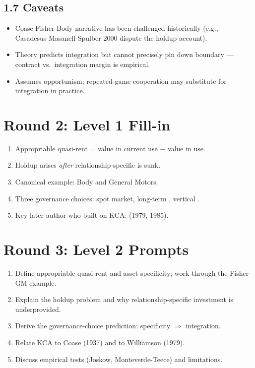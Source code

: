 \documentclass[11pt]{article}
\newcommand{\blank}[1]{\underline{\hspace{#1}}}
\begin{document}
\subsection*{1.7 Caveats}
\begin{alertbox}
\begin{itemize}
\item Coase-Fisher-Body narrative has been challenged historically (e.g., Casadesus-Masanell-Spulber 2000 dispute the holdup account).
\item Theory predicts integration but cannot precisely pin down boundary --- contract vs.\ integration margin is empirical.
\item Assumes opportunism; repeated-game cooperation may substitute for integration in practice.
\end{itemize}
\end{alertbox}

\section*{Round 2: Level 1 Fill-in}
\begin{enumerate}
\item Appropriable quasi-rent = value in current use $-$ value in \blank{2cm} use.
\item Holdup arises \emph{after} relationship-specific \blank{1.5cm} is sunk.
\item Canonical example: \blank{2cm} Body and General Motors.
\item Three governance choices: spot market, long-term \blank{1.5cm}, vertical \blank{2cm}.
\item Key later author who built on KCA: \blank{2cm} (1979, 1985).
\end{enumerate}

\section*{Round 3: Level 2 Prompts}
\begin{enumerate}
\item Define appropriable quasi-rent and asset specificity; work through the Fisher-GM example.
\item Explain the holdup problem and why relationship-specific investment is underprovided.
\item Derive the governance-choice prediction: specificity $\Rightarrow$ integration.
\item Relate KCA to Coase (1937) and to Williamson (1979).
\item Discuss empirical tests (Joskow, Monteverde-Teece) and limitations.
\end{enumerate}
\end{document}
